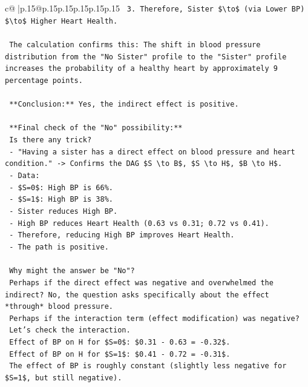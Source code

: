 \documentclass{article}
\begin{document}
{\begin{supertabular}{c@{$\;$}|p{.15\linewidth}@{}p{.15\linewidth}p{.15\linewidth}p{.15\linewidth}p{.15\linewidth}p{.15\linewidth}}
{{{\texttt{    3. Therefore, Sister \$\textbackslash{}to\$ (via Lower BP) \$\textbackslash{}to\$ Higher Heart Health.} \\
\\ 
\texttt{    The calculation confirms this: The shift in blood pressure distribution from the "No Sister" profile to the "Sister" profile increases the probability of a healthy heart by approximately 9 percentage points.} \\
\\ 
\texttt{    **Conclusion:** Yes, the indirect effect is positive.} \\
\\ 
\texttt{    **Final check of the "No" possibility:**} \\
\texttt{    Is there any trick?} \\
\texttt{    {-} "Having a sister has a direct effect on blood pressure and heart condition." {-}> Confirms the DAG \$S \textbackslash{}to B\$, \$S \textbackslash{}to H\$, \$B \textbackslash{}to H\$.} \\
\texttt{    {-} Data:} \\
\texttt{      {-} \$S=0\$: High BP is 66\%.} \\
\texttt{      {-} \$S=1\$: High BP is 38\%.} \\
\texttt{      {-} Sister reduces High BP.} \\
\texttt{      {-} High BP reduces Heart Health (0.63 vs 0.31; 0.72 vs 0.41).} \\
\texttt{      {-} Therefore, reducing High BP improves Heart Health.} \\
\texttt{      {-} The path is positive.} \\
\\ 
\texttt{    Why might the answer be "No"?} \\
\texttt{    Perhaps if the direct effect was negative and overwhelmed the indirect? No, the question asks specifically about the effect *through* blood pressure.} \\
\texttt{    Perhaps if the interaction term (effect modification) was negative?} \\
\texttt{    Let's check the interaction.} \\
\texttt{    Effect of BP on H for \$S=0\$: \$0.31 {-} 0.63 = {-}0.32\$.} \\
\texttt{    Effect of BP on H for \$S=1\$: \$0.41 {-} 0.72 = {-}0.31\$.} \\
\texttt{    The effect of BP is roughly constant (slightly less negative for \$S=1\$, but still negative).} \\
}}}
\end{supertabular}}
\end{document}
